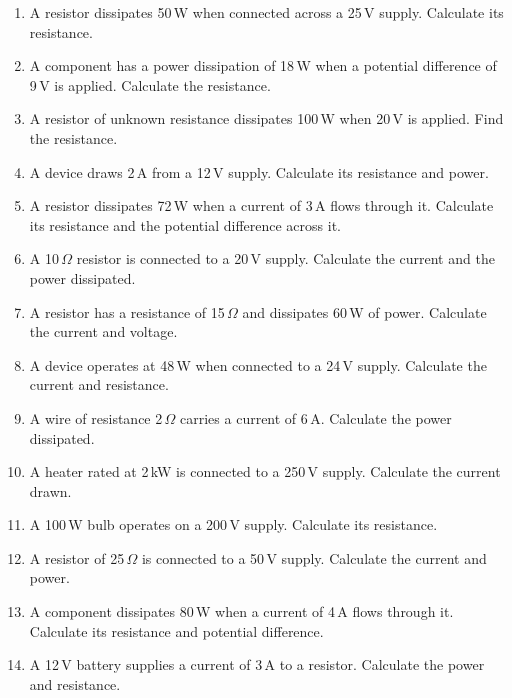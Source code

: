 \documentclass[a4paper,12pt]{article}
\begin{document}
\begin{enumerate}
\item A resistor dissipates 50\,W when connected across a 25\,V supply. Calculate its resistance.

\item A component has a power dissipation of 18\,W when a potential difference of 9\,V is applied. Calculate the resistance.

\item A resistor of unknown resistance dissipates 100\,W when 20\,V is applied. Find the resistance.

\item A device draws 2\,A from a 12\,V supply. Calculate its resistance and power.

\item A resistor dissipates 72\,W when a current of 3\,A flows through it. Calculate its resistance and the potential difference across it.

\item A 10\,$\Omega$ resistor is connected to a 20\,V supply. Calculate the current and the power dissipated.

\item A resistor has a resistance of 15\,$\Omega$ and dissipates 60\,W of power. Calculate the current and voltage.

\item A device operates at 48\,W when connected to a 24\,V supply. Calculate the current and resistance.

\item A wire of resistance 2\,$\Omega$ carries a current of 6\,A. Calculate the power dissipated.

\item A heater rated at 2\,kW is connected to a 250\,V supply. Calculate the current drawn.

\item A 100\,W bulb operates on a 200\,V supply. Calculate its resistance.

\item A resistor of 25\,$\Omega$ is connected to a 50\,V supply. Calculate the current and power.

\item A component dissipates 80\,W when a current of 4\,A flows through it. Calculate its resistance and potential difference.

\item A 12\,V battery supplies a current of 3\,A to a resistor. Calculate the power and resistance.


\end{enumerate}
\end{document}
